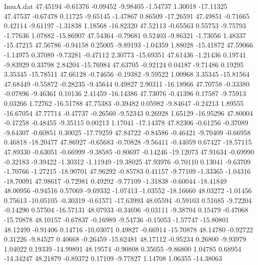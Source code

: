 \begin{filecontents}{ImuA.dat}
  47.45194   -0.61376   -0.09452   -9.98405   -1.54737    1.30018  -17.11325
  47.47537   -0.67478    0.11725   -9.65145   -1.47867    0.86509  -17.26591
  47.49851   -0.71665    0.42114   -9.61197   -1.31838    1.18568  -16.82320
  47.52113   -0.65563    0.55753   -9.75793   -1.77636    1.07882  -15.86907
  47.54364   -0.79681    0.52403   -9.86321   -1.73056    1.48337  -15.47215
  47.56786   -0.94158    0.25005   -9.89193   -1.04359    1.88028  -15.41872
  47.59066   -1.14975    0.37089   -9.73281   -0.47112    2.30773  -15.69351
  47.61436   -1.21436    0.19741   -9.83929    0.33798    2.84204  -15.76984
  47.63705   -0.92124    0.04187   -9.71486    0.19295    3.35345  -15.78511
  47.66128   -0.74656   -0.19382   -9.59522    1.00968    3.35345  -15.81564
  47.68449   -0.55872   -0.28235   -9.45644    0.49827    2.90311  -16.18966
  47.70758   -0.33380   -0.07896   -9.46361    0.10136    2.41459  -16.14386
  47.73076   -0.41396    0.17587   -9.75913    0.03266    1.72762  -16.51788
  47.75383   -0.39482    0.05982   -9.84647   -0.24213    1.89555  -16.67054
  47.77714   -0.47737   -0.26560   -9.52343    0.26928    1.65129  -16.95296
  47.80004   -0.47258   -0.48455   -9.35115    0.00213    1.17041  -17.14378
  47.82306   -0.61256   -0.37089   -9.64307   -0.60851    0.30025  -17.79259
  47.84722   -0.84586   -0.46421   -9.70409   -0.66958    0.46818  -18.20477
  47.86927   -0.65683   -0.70828   -9.56411   -0.44059    0.67427  -18.57115
  47.89330   -0.63051   -0.66999   -9.38585   -0.80697   -0.14246  -19.12073
  47.91634   -0.69990   -0.32183   -9.39422   -1.30312   -1.11949  -19.38025
  47.93976   -0.70110    0.13041   -9.63709   -1.70766   -1.27215  -18.90701
  47.96292   -0.85783    0.41157   -9.77109   -1.33365   -1.04316  -18.70091
  47.98617   -0.72981    0.49292   -9.77109   -1.31838   -0.60044  -18.41849
  48.00956   -0.94516    0.57069   -9.69332   -1.07413   -1.03552  -18.16660
  48.03272   -1.01456    0.75613  -10.05105   -0.30319   -0.61571  -17.63993
  48.05594   -0.59103    0.51685   -9.72204   -0.14290    0.57504  -16.57131
  48.07933   -0.34696   -0.03111   -9.38704    0.15479   -0.47068  -15.70878
  48.10157   -0.67837   -0.16989   -9.54736   -0.15053   -1.57747  -15.80801
  48.12499   -0.91406    0.14716  -10.03071    0.49827   -0.66914  -15.70878
  48.14780   -0.92722    0.31226   -9.84527    0.40668   -0.26459  -15.62481
  48.17112   -0.95234    0.26800   -9.93979    1.04022    0.19339  -14.99891
  48.19574   -0.90808    0.35055   -9.86800    1.04785    0.68954  -14.34247
  48.21879   -0.89372    0.17109   -9.77827    1.14708    1.06355  -14.38063

\end{filecontents}
